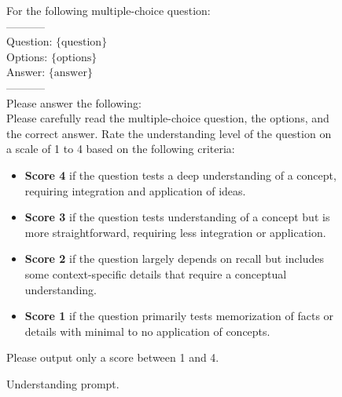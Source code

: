 \begin{figure}[h]
\centering
\begin{tcolorbox}[width=1\columnwidth, fontupper=\footnotesize,title=Understanding Evaluation Prompt]
\RaggedRight
\obeylines

{For the following multiple-choice question:\\
-----------\\
Question: $\{\text{question}\}$\\
\vspace{3mm}
Options: $\{\text{options}\}$\\
\vspace{3mm}
Answer: $\{\text{answer}\}$\\
-----------\\
Please answer the following:\\

Please carefully read the multiple-choice question, the options, and the correct answer.
Rate the understanding level of the question on a scale of 1 to 4 based on the following criteria:
\begin{itemize}[label=-,nosep]
\item \textbf{Score 4} if the question tests a deep understanding of a concept, requiring integration and application of ideas.
\item \textbf{Score 3} if the question tests understanding of a concept but is more straightforward, requiring less integration or application.
\item \textbf{Score 2} if the question largely depends on recall but includes some context-specific details that require a conceptual understanding.
\item \textbf{Score 1} if the question primarily tests memorization of facts or details with minimal to no application of concepts.
\end{itemize}


Please output only a score between 1 and 4.
}

\end{tcolorbox}
\caption{Understanding prompt.}
\label{fig:understanding_prompt}
\end{figure}




